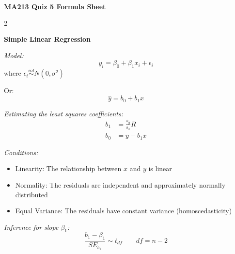 \documentclass[8pt]{article}
\begin{document}
\begin{center}
    {\LARGE \textbf{MA213 Quiz 5 Formula Sheet}}
\end{center}

\vspace{1em}





\clearpage

\begin{multicols}{2} %







\clearpage

\textbf{Simple Linear Regression}

\textit{Model:}
\[ y_i = \beta_0 + \beta_1 x_i + \epsilon_i \]
where $\epsilon_i \stackrel{iid}{\sim} N(0, \sigma^2)$ 

Or:
\[\hat{y} = b_0 + b_1 x\]

\textit{Estimating the least squares coefficients:}
\begin{align*}
    b_1 &= \frac{s_{y}}{s_{x}} R \\
    b_0 &= \bar{y} - b_1 \bar{x}
\end{align*} 

\textit{Conditions:}
\begin{itemize}
    \item Linearity: The relationship between $x$ and $y$ is linear
    \item Normality: The residuals are independent and approximately normally distributed
    \item Equal Variance: The residuals have constant variance (homoscedasticity)
\end{itemize}

\textit{Inference for slope $\beta_1$:}
\[ \frac{b_1-\beta_1}{SE_{b_1}} \sim t_{df} \qquad df = n-2 \]

\end{multicols} %
\end{document}
